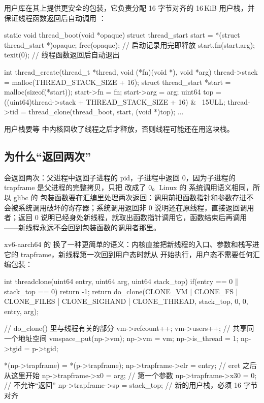 用户库在其上提供更安全的包装，它负责分配 16 字节对齐的 16\,KiB 用户栈，并保证线程函数返回后自动调用 ：

\begin{ccode}
static void thread_boot(void *opaque) {
  struct thread_start start = *(struct thread_start *)opaque;
  free(opaque);                       // 启动记录用完即释放
  start.fn(start.arg);
  texit(0);                           // 线程函数返回后自动退出
}

int thread_create(thread_t *thread, void (*fn)(void *), void *arg) {
  thread->stack = malloc(THREAD_STACK_SIZE + 16);
  struct thread_start *start = malloc(sizeof(*start));
  start->fn = fn;  start->arg = arg;
  uint64 top = ((uint64)thread->stack + THREAD_STACK_SIZE + 16) & ~15ULL;
  thread->tid = thread_clone(thread_boot, start, (void *)top);
  ...
}
\end{ccode}

用户栈要等  中内核回收了线程之后才释放，否则线程可能还在用这块栈。

\subsection{ 为什么“返回两次”}

 会返回两次：父进程中返回子进程的 pid，子进程中返回 0，因为子进程的 trapframe 是父进程的完整拷贝，只把  改成了 0。Linux 的  系统调用语义相同，所以 glibc 的  包装函数要在汇编里处理两次返回：调用前把函数指针和参数存进不会被系统调用破坏的寄存器；系统调用返回非 0 说明还在原线程，直接返回调用者；返回 0 说明已经身处新线程，就取出函数指针调用它，函数结束后再调用 ——新线程永远不会回到包装函数的调用者那里。

xv6-aarch64 的  换了一种更简单的语义：内核直接把新线程的入口、参数和栈写进它的 trapframe，新线程第一次回到用户态时就从  开始执行，用户态不需要任何汇编包装：

\begin{ccode}
int threadclone(uint64 entry, uint64 arg, uint64 stack_top)
{
  if(entry == 0 || stack_top == 0)
    return -1;
  return do_clone(CLONE_VM | CLONE_FS | CLONE_FILES | CLONE_SIGHAND |
                  CLONE_THREAD, stack_top, 0, 0, entry, arg);
}

// do_clone() 里与线程有关的部分
  vm->refcount++; vm->users++;          // 共享同一个地址空间
  vmspace_put(np->vm);
  np->vm = vm;
  np->is_thread = 1;
  np->tgid = p->tgid;

  *(np->trapframe) = *(p->trapframe);
  np->trapframe->elr = entry;           // eret 之后从这里开始
  np->trapframe->x0  = arg;             // 第一个参数
  np->trapframe->x30 = 0;               // 不允许“返回”
  np->trapframe->sp  = stack_top;       // 新的用户栈，必须 16 字节对齐
\end{ccode}

